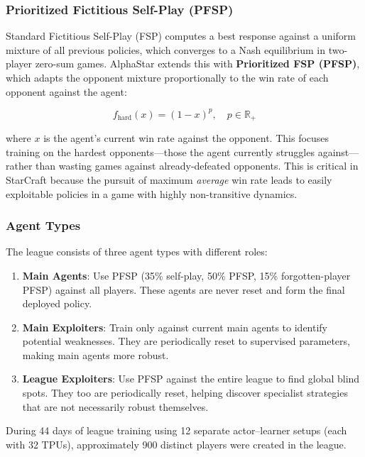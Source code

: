 \documentclass[11pt,a4paper]{article}
\begin{document}
\subsubsection{Prioritized Fictitious Self-Play (PFSP)}

Standard Fictitious Self-Play (FSP) computes a best response against a uniform mixture of all previous policies, which converges to a Nash equilibrium in two-player zero-sum games. AlphaStar extends this with \textbf{Prioritized FSP (PFSP)}, which adapts the opponent mixture proportionally to the win rate of each opponent against the agent:

\begin{equation}
    f_{\text{hard}}(x) = (1-x)^p, \quad p \in \mathbb{R}_+
\end{equation}

where $x$ is the agent's current win rate against the opponent. This focuses training on the hardest opponents---those the agent currently struggles against---rather than wasting games against already-defeated opponents. This is critical in StarCraft because the pursuit of maximum \emph{average} win rate leads to easily exploitable policies in a game with highly non-transitive dynamics.

\subsubsection{Agent Types}

The league consists of three agent types with different roles:

\begin{enumerate}[nosep]
    \item \textbf{Main Agents}: Use PFSP (35\% self-play, 50\% PFSP, 15\% forgotten-player PFSP) against all players. These agents are never reset and form the final deployed policy.
    \item \textbf{Main Exploiters}: Train only against current main agents to identify potential weaknesses. They are periodically reset to supervised parameters, making main agents more robust.
    \item \textbf{League Exploiters}: Use PFSP against the entire league to find global blind spots. They too are periodically reset, helping discover specialist strategies that are not necessarily robust themselves.
\end{enumerate}

During 44 days of league training using 12 separate actor--learner setups (each with 32 TPUs), approximately 900 distinct players were created in the league.
\end{document}
